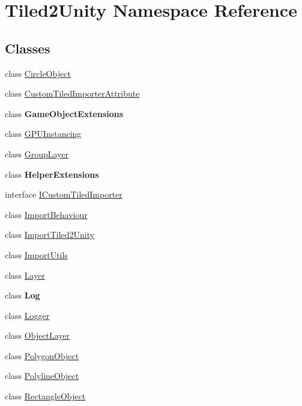 \hypertarget{namespace_tiled2_unity}{}\section{Tiled2\+Unity Namespace Reference}
\label{namespace_tiled2_unity}
\subsection*{Classes}
\begin{DoxyCompactItemize}
\item 
class \mbox{\hyperlink{class_tiled2_unity_1_1_circle_object}{Circle\+Object}}
\item 
class \mbox{\hyperlink{class_tiled2_unity_1_1_custom_tiled_importer_attribute}{Custom\+Tiled\+Importer\+Attribute}}
\item 
class {\bfseries Game\+Object\+Extensions}
\item 
class \mbox{\hyperlink{class_tiled2_unity_1_1_g_p_u_instancing}{G\+P\+U\+Instancing}}
\item 
class \mbox{\hyperlink{class_tiled2_unity_1_1_group_layer}{Group\+Layer}}
\item 
class {\bfseries Helper\+Extensions}
\item 
interface \mbox{\hyperlink{interface_tiled2_unity_1_1_i_custom_tiled_importer}{I\+Custom\+Tiled\+Importer}}
\item 
class \mbox{\hyperlink{class_tiled2_unity_1_1_import_behaviour}{Import\+Behaviour}}
\item 
class \mbox{\hyperlink{class_tiled2_unity_1_1_import_tiled2_unity}{Import\+Tiled2\+Unity}}
\item 
class \mbox{\hyperlink{class_tiled2_unity_1_1_import_utils}{Import\+Utils}}
\item 
class \mbox{\hyperlink{class_tiled2_unity_1_1_layer}{Layer}}
\item 
class {\bfseries Log}
\item 
class \mbox{\hyperlink{class_tiled2_unity_1_1_logger}{Logger}}
\item 
class \mbox{\hyperlink{class_tiled2_unity_1_1_object_layer}{Object\+Layer}}
\item 
class \mbox{\hyperlink{class_tiled2_unity_1_1_polygon_object}{Polygon\+Object}}
\item 
class \mbox{\hyperlink{class_tiled2_unity_1_1_polyline_object}{Polyline\+Object}}
\item 
class \mbox{\hyperlink{class_tiled2_unity_1_1_rectangle_object}{Rectangle\+Object}}

\end{DoxyCompactItemize}
